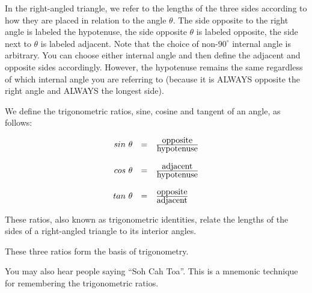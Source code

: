 

In the right-angled triangle, we refer to the lengths of the three sides according to how they are placed in relation to the angle $\theta $. The side opposite to the right angle is labeled the hypotenuse, the side opposite $\theta $ is labeled opposite, the side next to $\theta $ is labeled adjacent. Note that the choice of non-$90^{\circ}$ internal angle is arbitrary. You can choose either internal angle and then define the adjacent and opposite sides accordingly. However, the hypotenuse remains the same regardless of which internal angle you are referring to (because it is ALWAYS opposite the right angle and ALWAYS the longest side).\par 

We define the trigonometric ratios, sine, cosine and tangent of an angle, as follows:
\par 

\begin{equation*}
\begin{array}{ccc}\hfill sin~\theta & =& \frac{\mbox{opposite}}{\mbox{hypotenuse}}\hfill \\
\\
 \hfill cos~\theta & =& \frac{\mbox{adjacent}}{\mbox{hypotenuse}}\hfill \\
\\
 \hfill tan~\theta & =& \frac{\mbox{opposite}}{\mbox{adjacent}}\hfill 
\end{array}
\end{equation*}

These ratios, also known as trigonometric identities, relate the lengths of the sides of a right-angled triangle to its interior angles.\par 

These three ratios form the basis of trigonometry. \par

You may also hear people saying ``Soh Cah Toa''. This is a mnemonic technique for remembering the trigonometric ratios.\par 


